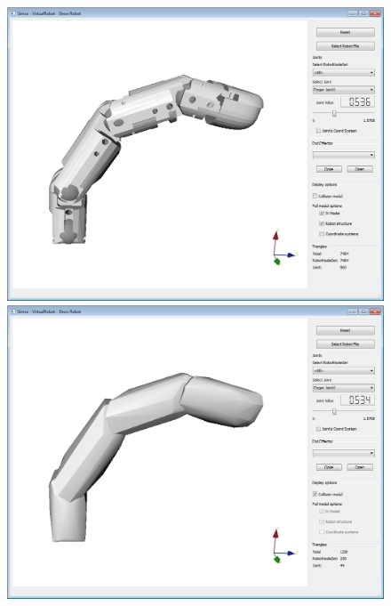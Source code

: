 \documentclass{book}
\begin{document}
\par
\begin{figure}[H]
	\centering
	\begin{minipage} {.45\linewidth}
	  \includegraphics[width=\linewidth]{Tutorial6a}
	\end{minipage}
	\begin{minipage} {.45\linewidth}
	  \includegraphics[width=\linewidth]{Tutorial6b}
	\end{minipage}
\end{figure}
\par
\end{document}
